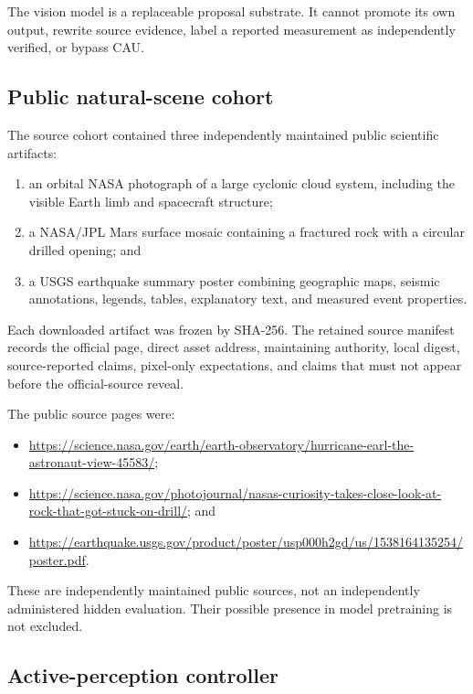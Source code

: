 The vision model is a replaceable proposal substrate.  It cannot promote its
own output, rewrite source evidence, label a reported measurement as
independently verified, or bypass CAU.


\subsection{Public natural-scene cohort}
\label{subsec:arena-v6-cohort}

The source cohort contained three independently maintained public scientific
artifacts:
\begin{enumerate}
  \item an orbital NASA photograph of a large cyclonic cloud system, including
        the visible Earth limb and spacecraft structure;
  \item a NASA/JPL Mars surface mosaic containing a fractured rock with a
        circular drilled opening; and
  \item a USGS earthquake summary poster combining geographic maps, seismic
        annotations, legends, tables, explanatory text, and measured event
        properties.
\end{enumerate}

Each downloaded artifact was frozen by SHA-256.  The retained source manifest
records the official page, direct asset address, maintaining authority, local
digest, source-reported claims, pixel-only expectations, and claims that must
not appear before the official-source reveal.

The public source pages were:
\begin{itemize}
  \item \url{https://science.nasa.gov/earth/earth-observatory/hurricane-earl-the-astronaut-view-45583/};
  \item \url{https://science.nasa.gov/photojournal/nasas-curiosity-takes-close-look-at-rock-that-got-stuck-on-drill/}; and
  \item \url{https://earthquake.usgs.gov/product/poster/usp000h2gd/us/1538164135254/poster.pdf}.
\end{itemize}

These are independently maintained public sources, not an independently
administered hidden evaluation.  Their possible presence in model pretraining
is not excluded.


\subsection{Active-perception controller}
\label{subsec:arena-v6-active-perception}

